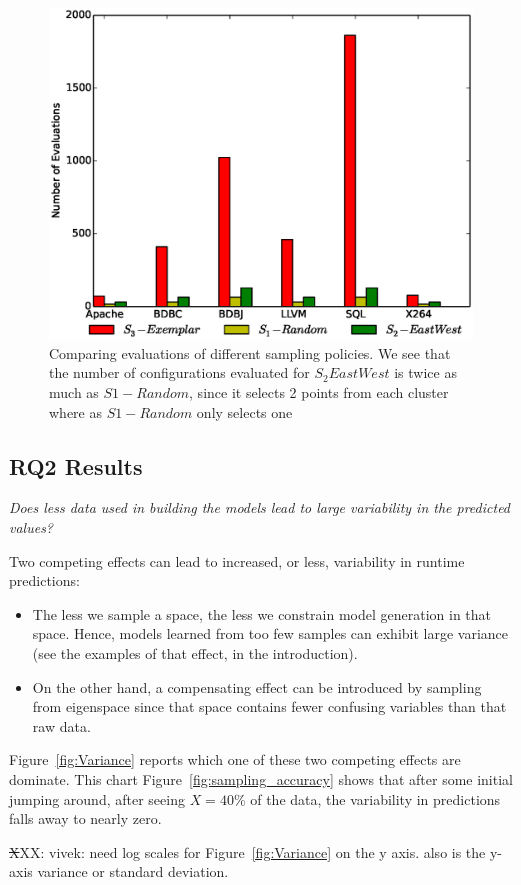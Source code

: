 \documentclass{sig-alternative}
\newcommand{\bi}{\begin{itemize}}%
\newcommand{\ei}{\end{itemize}}
\newcommand{\fig}[1]{Figure~\ref{fig:#1}}
\begin{document}
\begin{figure}[!t]
\includegraphics[width=0.9\linewidth]{Figures/evaluation_graph.eps}
\caption{ Comparing evaluations of different sampling policies. We see that the number of configurations evaluated for $S_2 East West$ is twice as much as $S1-Random$, since it selects 2 points from each cluster where as  $S1-Random$ only selects one }\label{fig:Evaluations}
\end{figure}


\subsection{RQ2 Results}

{\em
Does less data used in building the models lead to large variability in the predicted values?}

Two competing effects can lead to increased, or less,  variability  in 
runtime predictions:
\bi
\item
The less we sample a space,
the less we constrain model generation in that space. Hence, models learned
from too few samples can exhibit large variance (see the examples of that effect,
in the introduction). 
\item
On the other hand, a compensating effect can be introduced by sampling from eigenspace
since that space contains fewer confusing variables than that raw data.
\ei
\fig{Variance} reports which one of these two competing effects are dominate. 
This chart \fig{sampling_accuracy} shows that after some initial jumping around,
after seeing $X=40$\% of the data, the variability in predictions falls away to nearly zero.

{\st XXX: vivek: need log scales for \fig{Variance} on the y axis. also is the y-axis variance or standard deviation.}
\end{document}

